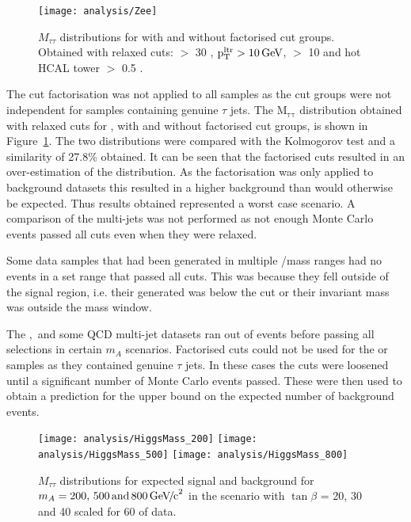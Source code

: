 \begin{figure}[!tb]
\centering
\texttt{[image: analysis/Zee]}
\caption{$M_{\tau \tau}$ distributions for \Zee with and without factorised cut groups. Obtained with relaxed cuts: \ET $>$ 30 \GeV, $\mathrm{p_{T}^{ltr} > 10 \,\mathrm{Ge\hspace{-.08em}V}}$, \MET $>$ 10 \GeV and hot HCAL tower $>$ 0.5 \GeV.\label{fig:zee_factorised}}
\end{figure}

The cut factorisation was not applied to all samples as the cut groups were not independent for samples containing genuine $\tau$ jets. The $\mathrm{M_{\tau \tau}}$ distribution obtained with relaxed cuts for \Zee, with and without factorised cut groups, is shown in Figure~\ref{fig:zee_factorised}. The two distributions were compared with the Kolmogorov test and a similarity of 27.8\% obtained. It can be seen that the factorised cuts resulted in an over-estimation of the distribution. As the factorisation was only applied to background datasets this resulted in a higher background than would otherwise be expected. Thus results obtained represented a worst case scenario. A comparison of the multi-jets was not performed as not enough Monte Carlo events passed all cuts even when they were relaxed.

Some data samples that had been generated in multiple \ET/mass ranges had no events in a set range that passed all cuts. This was because they fell outside of the signal region, i.e. their generated \ET was below the cut or their invariant mass was outside the mass window.

The \TopTop, \Wjet\,and some QCD multi-jet datasets ran out of events before passing all selections in certain $m_{A}$ scenarios. Factorised cuts could not be used for the \Wjet\xspace or \TopTop\xspace  samples as they contained genuine $\tau$ jets. In these cases the cuts were loosened until a significant number of Monte Carlo events passed. These were then used to obtain a prediction for the upper bound on the expected number of background events.

\begin{figure}[!Hhtb]
\centering
\texttt{[image: analysis/HiggsMass\_200]}
\texttt{[image: analysis/HiggsMass\_500]}
\texttt{[image: analysis/HiggsMass\_800]}
\caption{$M_{\tau \tau}$ distributions for expected signal and background for $m_{A} = 200,\,500\, \mathrm{and}\,800{\,\mathrm{Ge\hspace{-.08em}V\hspace{-0.16em}/\hspace{-0.08em}c}^\mathrm{2}}$ in the \mhmax scenario with $\tan{\beta}$ = 20, 30 and 40 scaled for 60 \fb of data.\label{fig:mass_plots}}
\end{figure}

